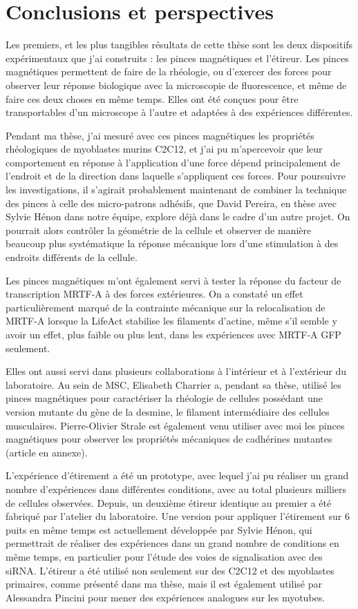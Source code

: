 \documentclass[10pt,twoside]{report}
\begin{document}
\chapter*{Conclusions et perspectives}

 Les premiers, et les plus tangibles résultats de cette thèse sont les deux dispositifs expérimentaux que j'ai construits : les pinces magnétiques et l'étireur. Les pinces magnétiques permettent de faire de la rhéologie, ou d'exercer des forces pour observer leur réponse biologique avec la microscopie de fluorescence, et même de faire ces deux choses en même temps. Elles ont été conçues pour être transportables d'un microscope à l'autre et adaptées à des expériences différentes. 
  
 Pendant ma thèse, j'ai mesuré avec ces pinces magnétiques les propriétés rhéologiques de myoblastes murins C2C12, et j'ai pu m'apercevoir que leur comportement en réponse à l'application d'une force dépend principalement de l'endroit et de la direction dans laquelle s'appliquent ces forces. Pour poursuivre les investigations, il s'agirait probablement maintenant de combiner la technique des pinces à celle des micro-patrons adhésifs, que David Pereira, en thèse avec Sylvie Hénon dans notre équipe, explore déjà dans le cadre d'un autre projet. On pourrait alors contrôler la géométrie de la cellule et observer de manière beaucoup plus systématique la réponse mécanique lors d'une stimulation à des endroits différents de la cellule. 

Les pinces magnétiques m'ont également servi à tester la réponse du facteur de transcription MRTF-A à des forces extérieures. On a constaté un effet particulièrement marqué de la contrainte mécanique sur la relocalisation de MRTF-A lorsque la LifeAct stabilise les filaments d'actine, même s'il semble y avoir un effet, plus faible ou plus lent, dans les expériences avec MRTF-A GFP seulement. 

Elles ont aussi servi dans plusieurs collaborations à l'intérieur et à l'extérieur du laboratoire. Au sein de MSC, Elisabeth Charrier a, pendant sa thèse, utilisé les pinces magnétiques pour caractériser la rhéologie de cellules possédant une version mutante du gène de la desmine, le filament intermédiaire des cellules musculaires. Pierre-Olivier Strale est également venu utiliser avec moi les pinces magnétiques pour observer les propriétés mécaniques de cadhérines mutantes (article en annexe). 

L'expérience d'étirement a été un prototype, avec lequel j'ai pu réaliser un grand nombre d'expériences dans différentes conditions, avec au total plusieurs milliers de cellules observées. Depuis, un deuxième étireur identique au premier a été fabriqué par l'atelier du laboratoire. Une version pour appliquer l'étirement sur 6 puits en même temps est actuellement développée par Sylvie Hénon, qui permettrait de réaliser des expériences dans un grand nombre de conditions en même temps, en particulier pour l'étude des voies de signalisation avec des siRNA. 
L'étireur a été utilisé non seulement sur des C2C12 et des myoblastes primaires, comme présenté dans ma thèse, mais il est également utilisé par Alessandra Pincini pour mener des expériences analogues sur les myotubes. 
\end{document}
